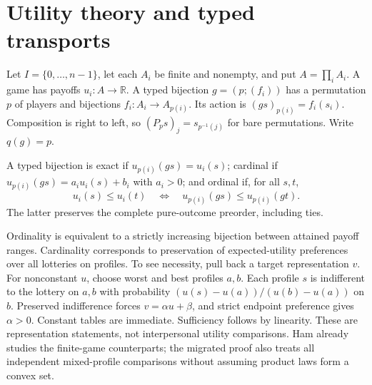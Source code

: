 \section{Utility theory and typed transports}
Let $I=\{0,\ldots,n-1\}$, let each $A_i$ be finite and nonempty, and put
$A=\prod_i A_i$. A game has payoffs $u_i:A\to\mathbb R$.
A typed bijection $g=(p;(f_i))$ has a permutation $p$ of players and bijections
$f_i:A_i\to A_{p(i)}$. Its action is $(gs)_{p(i)}=f_i(s_i)$.
Composition is right to left, so $(P_p s)_j=s_{p^{-1}(j)}$ for bare permutations.
Write $q(g)=p$.

\begin{definition}
A typed bijection is exact if $u_{p(i)}(gs)=u_i(s)$; cardinal if
$u_{p(i)}(gs)=a_i u_i(s)+b_i$ with $a_i>0$; and ordinal if, for all $s,t$,
\[
u_i(s)\le u_i(t)\quad\Longleftrightarrow\quad
u_{p(i)}(gs)\le u_{p(i)}(gt).
\]
The latter preserves the complete pure-outcome preorder, including ties.
\end{definition}
Ordinality is equivalent to a strictly increasing bijection between attained
payoff ranges. Cardinality corresponds to preservation of expected-utility
preferences over all lotteries on profiles. To see necessity, pull back a
target representation $v$. For nonconstant $u$, choose worst and best profiles
$a,b$. Each profile $s$ is indifferent to the lottery on $a,b$ with probability
$(u(s)-u(a))/(u(b)-u(a))$ on $b$. Preserved indifference forces $v=\alpha u+\beta$,
and strict endpoint preference gives $\alpha>0$. Constant tables are immediate.
Sufficiency follows by linearity. These are representation statements, not
interpersonal utility comparisons. Ham \citep[\S4.3]{hamthesis} already studies
the finite-game counterparts; the migrated proof also treats all independent
mixed-profile comparisons without assuming product laws form a convex set.

